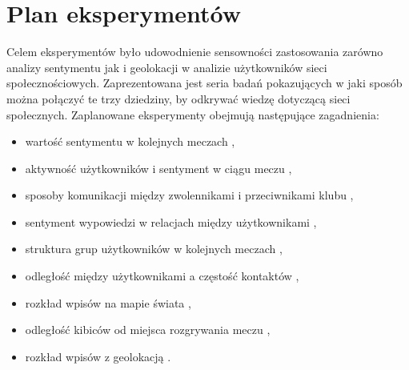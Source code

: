 




















\section{Plan eksperymentów}
Celem eksperymentów było udowodnienie sensowności
zastosowania zarówno analizy sentymentu jak i geolokacji w analizie użytkowników sieci 
społecznościowych. Zaprezentowana jest seria badań
pokazujących w jaki sposób można połączyć te trzy dziedziny, by odkrywać wiedzę
dotyczącą sieci społecznych. Zaplanowane eksperymenty obejmują następujące zagadnienia:
\begin{itemize}
  \item wartość sentymentu w kolejnych meczach 
  ,
  
  \item aktywność użytkowników i sentyment w ciągu meczu
  ,
  
  \item sposoby komunikacji między zwolennikami i przeciwnikami klubu 
  ,
  
  \item sentyment wypowiedzi w relacjach między użytkownikami
  ,
  
  \item struktura grup użytkowników w kolejnych meczach
  ,
  
  \item odległość między użytkownikami a częstość kontaktów
  ,
  
  \item rozkład wpisów na mapie świata
  ,
  
  \item odległość kibiców od miejsca rozgrywania meczu
  ,
  
  \item rozkład wpisów z geolokacją
  .
\end{itemize}

